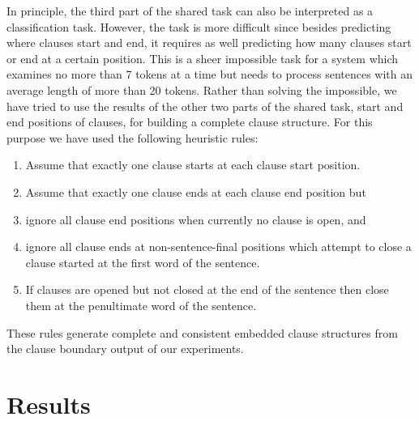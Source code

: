 \documentclass[11pt]{article}
\begin{document}
In principle, the third part of the shared task can also be
interpreted as a classification task.
However, the task is more difficult since besides predicting where
clauses start and end, it requires as well predicting how many clauses
start or end at a certain position.
This is a sheer impossible task for a system which examines no more
than 7 tokens at a time but needs to process sentences with an
average length of more than 20 tokens.
Rather than solving the impossible, we have tried to use the
results of the other two parts of the shared task, start and end
positions of clauses, for building a complete clause structure.
For this purpose we have used the following heuristic rules:

\begin{enumerate}
\itemsep -0.1cm
\item Assume that exactly one clause starts at each clause start
      position.
\item Assume that exactly one clause ends at each clause end
      position but
\item ignore all clause end positions when currently no clause is
      open, and 
\item ignore all clause ends at non-sentence-final positions
      which attempt to close a clause started at the first word of the
      sentence.
\item If clauses are opened but not closed at the end of the sentence
      then close them at the penultimate word of the sentence.
\end{enumerate}

\noindent
These rules 
generate complete and consistent
embedded clause structures from the clause 
boundary output of
our experiments.

\section{Results}
\end{document}
